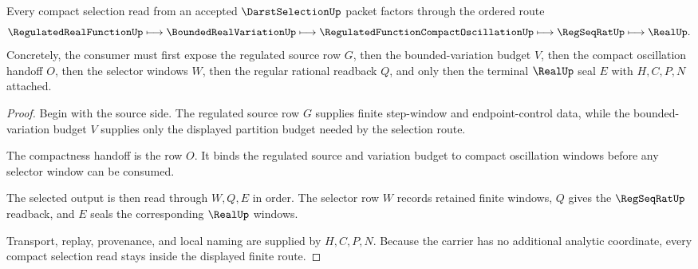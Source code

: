 \begin{theorem}
\label{thm:darst-selection-regulated-compact-handoff}
Every compact selection read from an accepted $\DarstSelectionUp$ packet factors through the ordered route
$$
\RegulatedRealFunctionUp \longmapsto \BoundedRealVariationUp \longmapsto \RegulatedFunctionCompactOscillationUp \longmapsto \RegSeqRatUp \longmapsto \RealUp .
$$
Concretely, the consumer must first expose the regulated source row $G$, then the bounded-variation budget $V$, then the compact oscillation handoff $O$, then the selector windows $W$, then the regular rational readback $Q$, and only then the terminal $\RealUp$ seal $E$ with $H,C,P,N$ attached.
\end{theorem}
\begin{proof}
Begin with the source side. The regulated source row $G$ supplies finite step-window and endpoint-control data, while the bounded-variation budget $V$ supplies only the displayed partition budget needed by the selection route.

The compactness handoff is the row $O$. It binds the regulated source and variation budget to compact oscillation windows before any selector window can be consumed.

The selected output is then read through $W,Q,E$ in order. The selector row $W$ records retained finite windows, $Q$ gives the $\RegSeqRatUp$ readback, and $E$ seals the corresponding $\RealUp$ windows.

Transport, replay, provenance, and local naming are supplied by $H,C,P,N$. Because the carrier has no additional analytic coordinate, every compact selection read stays inside the displayed finite route.
\end{proof}



